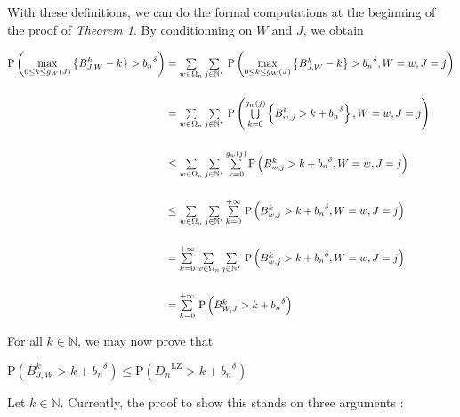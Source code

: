 \documentclass[11pt]{article}
\newcommand{\union}[2]{\bigcup\limits_{#1}^{#2}}
\newcommand{\proba}[1]{\text{P} \left( #1 \right) }
\newcommand{\question}[2][3]{%
	{\centering%
	\noindent\fbox{\bfseries#2}}\raggedright}%
\newcommand{\centers}[2][2]{
    \begin{center}
    {#2}\end{center}}
\newcommand\Sum[2]{\textstyle\sum\limits_{#1}^{#2}}
\newcommand{\pinf}{\tiny{+}\infty}
\begin{document}
\pagebreak
\hypertarget{computations}{\centers{\question{Computations}}} 
With these definitions, 
we can do the formal computations at the beginning 
of the proof of \emph{Theorem 1}.
By conditionning on $W$ and $J$, we obtain

\begin{align*}
         \proba{ \underset{ 0 \leq k \leq g_W(J) }{ \max } 
        \left\{ { B_{J, W}^k - k } \right\} > {b_n}^{\delta} }
            &= \Sum{w \in \Omega_n}{} \Sum{j \in \mathbb{N}^{\star}}{} \,
                \proba{ \underset{ 0 \leq k \leq g_W(J) }{ \max } 
        \left\{ { B_{J, W}^k - k } \right\} > {b_n}^{\delta}, W=w, J=j } \\[5mm]
            &= \Sum{w \in \Omega_n}{} \Sum{j \in \mathbb{N}^{\star}}{} \,
                \proba{ \union{k=0}{g_w(j)} \left\{ B_{w, j}^k > k + {b_n}^{\delta} \right\} 
                            ,W=w, J=j }\\[5mm]
            &\leq
                \Sum{w \in \Omega_n}{} \Sum{j \in \mathbb{N}^{\star}}{}
                \Sum{k=0}{g_w(j)} 
                \proba{ B_{w, j}^k > k + {b_n}^{\delta}, W=w, J=j } \\[5mm]
            &\leq
                \Sum{w \in \Omega_n}{} \Sum{j \in \mathbb{N}^{\star}}{}
                \Sum{k=0}{\pinf} \,
                \proba{ B_{w, j}^k > k + {b_n}^{\delta}, W=w, J=j }
                 \\[5mm]
            &=
                \Sum{k=0}{\pinf}
                \Sum{w \in \Omega_n}{} \Sum{j \in \mathbb{N}^{\star}}{} \,
                \proba{ B_{w, j}^k > k + {b_n}^{\delta}, W=w, J=j }
                 \\[5mm]
            &=
                \Sum{k=0}{\pinf} \,
                \proba{ B_{W, J}^k > k + {b_n}^{\delta} } \\
\end{align*}




\noindent
For all $k\in\mathbb{N}$, we may now prove that
    \centers{
        $ \proba{ B_{J, W}^k > k + {b_n}^{\delta} } 
            \leq \proba{ {D_n}^{\text{LZ}} > k + {b_n}^{\delta} } $
    }


\noindent
\hypertarget{critics}{}
Let $k \in\mathbb{N}$.
Currently, the proof to show this stands on three arguments :
\end{document}
